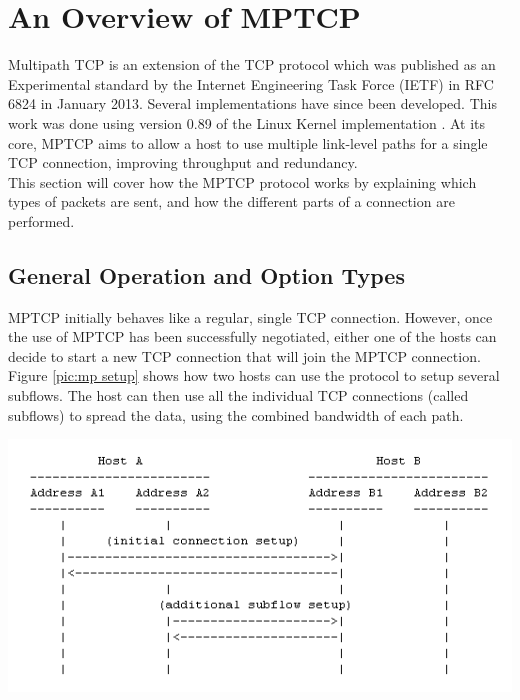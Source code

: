 

\chapter{An Overview of MPTCP} \label{chap:mptcp}
Multipath TCP is an extension of the TCP protocol which was published as an Experimental standard by the Internet Engineering Task Force (IETF) in RFC 6824 \cite{rfc6824} in January 2013. Several implementations have since been developed. This work was done using version 0.89 of the Linux Kernel implementation \cite{mptcp} . At its core, MPTCP aims to allow a host to use multiple link-level paths for a single TCP connection, improving throughput and redundancy.\\

This section will cover how the MPTCP protocol works by explaining which types of packets are sent, and how the different parts of a connection are performed.

\section{General Operation and Option Types}
MPTCP initially behaves like a regular, single TCP connection. However, once the use of MPTCP has been successfully negotiated, either one of the hosts can decide to start a new TCP connection that will join the MPTCP connection. Figure \ref{pic:mp setup} shows how two hosts can use the protocol to setup several subflows. The host can then use all the individual TCP connections (called subflows) to spread the data, using the combined bandwidth of each path.\\

\begin{minipage}[c]{\textwidth}
\centering
\includegraphics[scale=0.6]{Figures/mptcpsetup.png}
\label{pic:mp setup}
\end{minipage} \\

